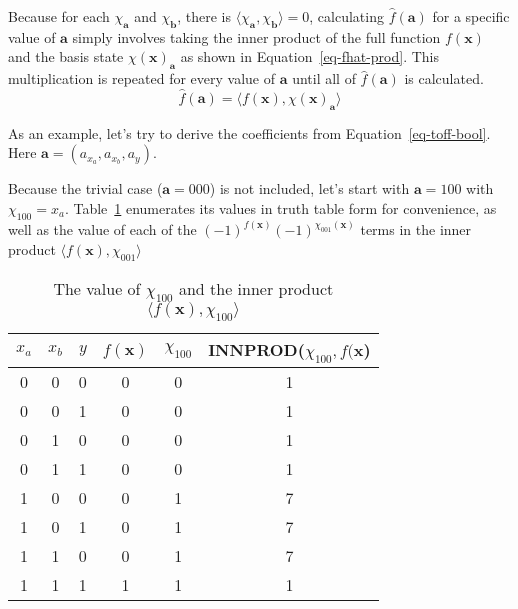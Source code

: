 \documentclass[a4paper]{article}
\begin{document}
Because for each $\chi_{\mathbf{a}}$ and $\chi_{\mathbf{b}}$, there is
$\langle \chi_{\mathbf{a}}, \chi_{\mathbf{b}} \rangle = 0$, calculating $\hat{f}(\mathbf{a})$ for a specific
value of $\mathbf{a}$ simply involves taking the inner product of the full function $f(\mathbf{x})$ and the
basis state $\chi(\mathbf{x})_{\mathbf{a}}$ as shown in Equation~\ref{eq-fhat-prod}. This multiplication is
repeated for every value of $\mathbf{a}$ until all of $\hat{f}(\mathbf{a})$ is calculated.
\begin{equation}
  \label{eq-fhat-prod}
  \hat{f}(\mathbf{a}) = \langle f(\mathbf{x}), \chi(\mathbf{x})_{\mathbf{a}} \rangle
\end{equation}

\begin{example}
  As an example, let's try to derive the coefficients from Equation~\ref{eq-toff-bool}. Here
  $\mathbf{a} = (a_{x_a}, a_{x_b}, a_y)$.

  Because the trivial case ($\mathbf{a}= 000$) is not included, let's start with $\mathbf{a} = 100$ with
  $\chi_{100} = x_a$.
  Table~\ref{table-ex-100} enumerates its values in truth table form for convenience, as well as the
  value of each of the $(-1)^{f(\mathbf{x})} (-1)^{\chi_{001}(\mathbf{x})}$ terms in the inner product
  $\langle f(\mathbf{x}), \chi_{001} \rangle$

  \begin{table}[h]
    \begin{center}
      \begin{tabular}{c|c|c|c|c|c}
        \hline
        $x_a$ & $x_b$ & $y$ & $f(\mathbf{x})$ & $\chi_{100}$ & INNPROD($\chi_{100},f(\mathbf{x}$) \\\hline
        0 & 0 & 0 & 0 & 0 & 1\\\hline
        0 & 0 & 1 & 0 & 0 & 1\\\hline
        0 & 1 & 0 & 0 & 0 & 1\\\hline
        0 & 1 & 1 & 0 & 0 & 1\\\hline
        1 & 0 & 0 & 0 & 1 & 7\\\hline
        1 & 0 & 1 & 0 & 1 & 7\\\hline
        1 & 1 & 0 & 0 & 1 & 7\\\hline      
        1 & 1 & 1 & 1 & 1 & 1\\\hline
      \end{tabular}
      \caption{The value of $\chi_{100}$ and the inner product $\langle f(\mathbf{x}), \chi_{100} \rangle$}
      \label{table-ex-100}
    \end{center}
  \end{table}


\end{example}
\end{document}
